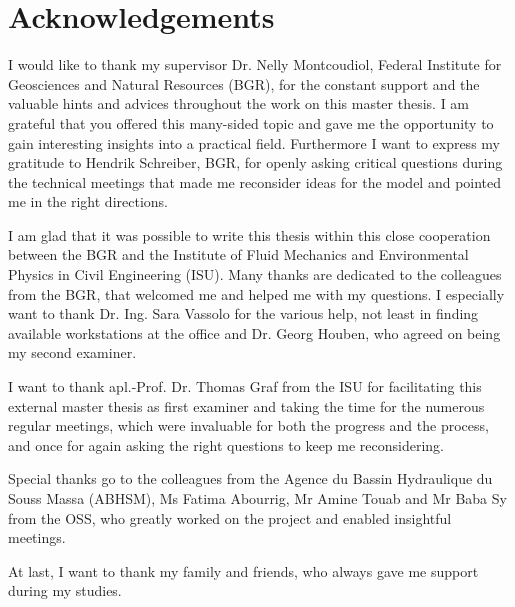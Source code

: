 \thispagestyle{plain}
\section*{Acknowledgements}

I would like to thank my supervisor Dr. Nelly Montcoudiol, Federal Institute for Geosciences and Natural Resources (BGR), for the constant support and the valuable hints and advices throughout the work on this master thesis. 
I am grateful that you offered this many-sided topic and gave me the opportunity to gain interesting insights into a practical field. 
Furthermore I want to express my gratitude to Hendrik Schreiber, BGR, for openly asking critical questions during the technical meetings that made me reconsider ideas for the model and pointed me in the right directions.

I am glad that it was possible to write this thesis within this close cooperation between the BGR and the Institute of Fluid Mechanics and Environmental Physics in Civil Engineering (ISU). 
Many thanks are dedicated to the colleagues from the BGR, that welcomed me and helped me with my questions. 
I especially want to thank Dr. Ing. Sara Vassolo for the various help, not least in finding available workstations at the office and Dr. Georg Houben, who agreed on being my second examiner.

I want to thank apl.-Prof. Dr. Thomas Graf from the ISU for facilitating this external master thesis as first examiner and taking the time for the numerous regular meetings, which were invaluable for both the progress and the process, and once for again asking the right questions to keep me reconsidering.

Special thanks go to the colleagues from the Agence du Bassin Hydraulique du Souss Massa (ABHSM), Ms Fatima Abourrig, Mr Amine Touab and Mr Baba Sy from the OSS, who greatly worked on the project and enabled insightful meetings.

At last, I want to thank my family and friends, who always gave me support during my studies.